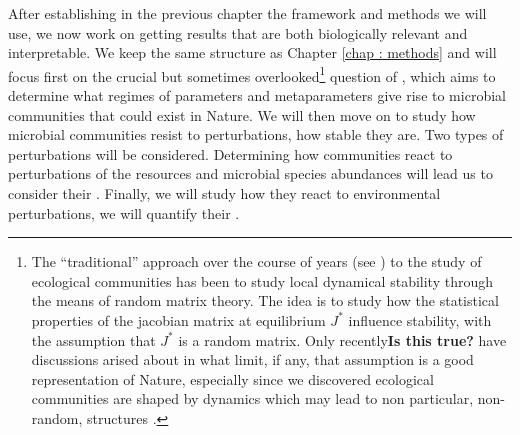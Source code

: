 \documentclass[12pt]{report}
\begin{document}
After establishing in the previous chapter the framework and methods we will use, we now work on getting results that are both biologically relevant and interpretable. We keep the same structure as Chapter \ref{chap : methods} and will focus first on the crucial but sometimes overlooked\footnote{The ``traditional'' approach over the course of years (see \eg \cite{may_will_1972}) to the study of ecological communities has been to study local dynamical stability through the means of random matrix theory. The idea is to study how the statistical properties of the jacobian matrix at equilibrium $J^*$ influence stability, with the assumption that $J^*$ is a random matrix. Only recently\textbf{Is this true?} have discussions arised \cite{allesina_stabilitycomplexity_2015, rohr_structural_2014} about in what limit, if any, that assumption is a good representation of Nature, especially since we discovered ecological communities are shaped by dynamics which may lead to non particular, non-random, structures \cite{bascompte_nested_2003, bastolla_architecture_2009, bonsall_life_2004, thebault_stability_2010}.} question of , which aims to determine what regimes of parameters and metaparameters give rise to microbial communities that could exist in Nature. We will then move on to study how microbial communities resist to perturbations, \ie how stable they are. Two types of perturbations will be considered. Determining how communities react to perturbations of the resources and microbial species abundances will lead us to consider their . Finally, we will study how they react to environmental perturbations, \ie we will quantify their .
\end{document}
